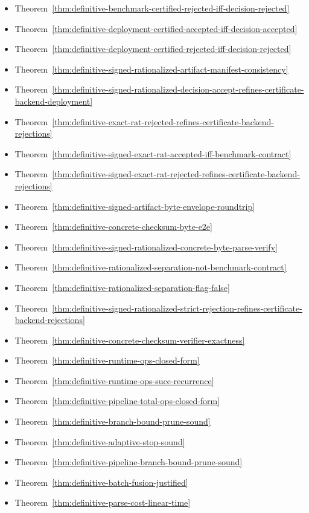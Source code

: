 \begin{itemize}
\item Theorem~\ref{thm:definitive-benchmark-certified-rejected-iff-decision-rejected}
\item Theorem~\ref{thm:definitive-deployment-certified-accepted-iff-decision-accepted}
\item Theorem~\ref{thm:definitive-deployment-certified-rejected-iff-decision-rejected}
\item Theorem~\ref{thm:definitive-signed-rationalized-artifact-manifest-consistency}
\item Theorem~\ref{thm:definitive-signed-rationalized-decision-accept-refines-certificate-backend-deployment}
\item Theorem~\ref{thm:definitive-exact-rat-rejected-refines-certificate-backend-rejections}
\item Theorem~\ref{thm:definitive-signed-exact-rat-accepted-iff-benchmark-contract}
\item Theorem~\ref{thm:definitive-signed-exact-rat-rejected-refines-certificate-backend-rejections}
\item Theorem~\ref{thm:definitive-signed-artifact-byte-envelope-roundtrip}
\item Theorem~\ref{thm:definitive-concrete-checksum-byte-e2e}
\item Theorem~\ref{thm:definitive-signed-rationalized-concrete-byte-parse-verify}
\item Theorem~\ref{thm:definitive-rationalized-separation-not-benchmark-contract}
\item Theorem~\ref{thm:definitive-rationalized-separation-flag-false}
\item Theorem~\ref{thm:definitive-signed-rationalized-strict-rejection-refines-certificate-backend-rejections}
\item Theorem~\ref{thm:definitive-concrete-checksum-verifier-exactness}
\item Theorem~\ref{thm:definitive-runtime-ops-closed-form}
\item Theorem~\ref{thm:definitive-runtime-ops-succ-recurrence}
\item Theorem~\ref{thm:definitive-pipeline-total-ops-closed-form}
\item Theorem~\ref{thm:definitive-branch-bound-prune-sound}
\item Theorem~\ref{thm:definitive-adaptive-stop-sound}
\item Theorem~\ref{thm:definitive-pipeline-branch-bound-prune-sound}
\item Theorem~\ref{thm:definitive-batch-fusion-justified}
\item Theorem~\ref{thm:definitive-parse-cost-linear-time}

\end{itemize}
